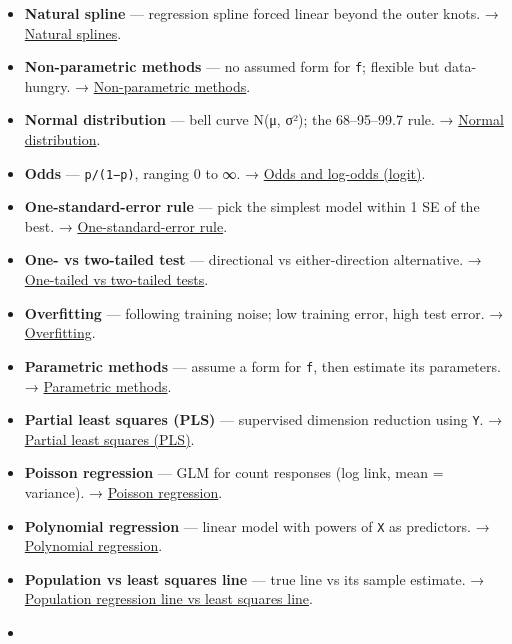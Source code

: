 \documentclass[
  10pt,
  letterpaper,
  onecolumn]{article}
\begin{document}
\begin{itemize}
  predictor independence. → \protect\hyperlink{naive-bayes}{Naive
  Bayes}.
\item
  \textbf{Natural spline} --- regression spline forced linear beyond the
  outer knots. → \protect\hyperlink{natural-splines}{Natural splines}.
\item
  \textbf{Non-parametric methods} --- no assumed form for \texttt{f};
  flexible but data-hungry. →
  \protect\hyperlink{non-parametric-methods}{Non-parametric methods}.
\item
  \textbf{Normal distribution} --- bell curve N(μ, σ²); the 68--95--99.7
  rule. → \protect\hyperlink{normal-distribution}{Normal distribution}.
\item
  \textbf{Odds} --- \texttt{p/(1−p)}, ranging 0 to ∞. →
  \protect\hyperlink{odds-and-log-odds-logit}{Odds and log-odds
  (logit)}.
\item
  \textbf{One-standard-error rule} --- pick the simplest model within 1
  SE of the best. →
  \protect\hyperlink{one-standard-error-rule}{One-standard-error rule}.
\item
  \textbf{One- vs two-tailed test} --- directional vs either-direction
  alternative. →
  \protect\hyperlink{one-tailed-vs-two-tailed-tests}{One-tailed vs
  two-tailed tests}.
\item
  \textbf{Overfitting} --- following training noise; low training error,
  high test error. → \protect\hyperlink{overfitting}{Overfitting}.
\item
  \textbf{Parametric methods} --- assume a form for \texttt{f}, then
  estimate its parameters. →
  \protect\hyperlink{parametric-methods}{Parametric methods}.
\item
  \textbf{Partial least squares (PLS)} --- supervised dimension
  reduction using \texttt{Y}. →
  \protect\hyperlink{partial-least-squares-pls}{Partial least squares
  (PLS)}.
\item
  \textbf{Poisson regression} --- GLM for count responses (log link,
  mean = variance). → \protect\hyperlink{poisson-regression}{Poisson
  regression}.
\item
  \textbf{Polynomial regression} --- linear model with powers of
  \texttt{X} as predictors. →
  \protect\hyperlink{polynomial-regression}{Polynomial regression}.
\item
  \textbf{Population vs least squares line} --- true line vs its sample
  estimate. →
  \protect\hyperlink{population-regression-line-vs-least-squares-line}{Population
  regression line vs least squares line}.
\item

\end{itemize}
\end{document}
